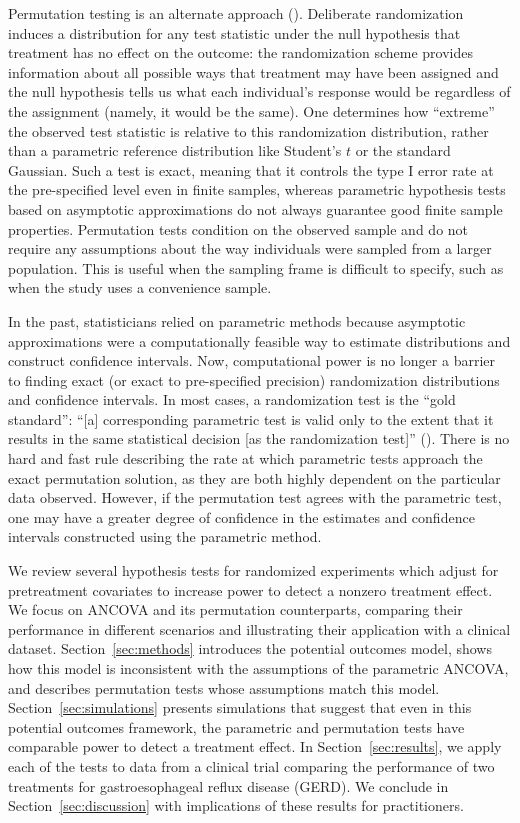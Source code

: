 \documentclass[12pt]{article}
\begin{document}
Permutation testing is an alternate approach (\cite{fisher_design_1935, pitman_significance_1937,pitman_significance_1938}).
Deliberate randomization induces a distribution for any test statistic under the null hypothesis that treatment has no effect on the outcome:
the randomization scheme provides information about all possible ways that treatment may have been assigned 
and the null hypothesis tells us what each individual's response would be regardless of the assignment (namely, it would be the same).
One determines how ``extreme'' the observed test statistic is relative to this randomization distribution, rather than a parametric reference distribution like Student's $t$ or the standard Gaussian.
Such a test is exact, meaning that it controls the type I error rate at the pre-specified level even in finite samples, whereas parametric hypothesis tests based on asymptotic approximations do not always guarantee good finite sample properties.
Permutation tests condition on the observed sample and do not require any assumptions about the way individuals were sampled from a larger population.
This is useful when the sampling frame is difficult to specify, such as when the study uses a convenience sample.

In the past, statisticians relied on parametric methods because asymptotic approximations were a computationally feasible way to estimate distributions and construct confidence intervals.
Now, computational power is no longer a barrier to finding exact (or exact to pre-specified precision) randomization distributions and confidence intervals.
In most cases, a randomization test is the ``gold standard'':
``[a] corresponding parametric test is valid only to the extent that it results in the same statistical decision [as the randomization test]'' (\cite{bradley_distribution_1968}).
There is no hard and fast rule describing the rate at which parametric tests approach the exact permutation solution, as they are both highly dependent on the particular data observed.
However, if the permutation test agrees with the parametric test, one may have a greater degree of confidence in the estimates and confidence intervals constructed using the parametric method.

We review several hypothesis tests for randomized experiments which adjust for pretreatment covariates to increase power to detect a nonzero treatment effect.  
We focus on ANCOVA and its permutation counterparts, comparing their performance in different scenarios and illustrating their application with a clinical dataset.
Section~\ref{sec:methods} introduces the potential outcomes model, shows how this model is inconsistent with the assumptions of the parametric ANCOVA, and describes permutation tests whose assumptions match this model.
Section~\ref{sec:simulations} presents simulations that suggest that even in this potential outcomes framework, the parametric and permutation tests have comparable power to detect a treatment effect.
In Section~\ref{sec:results}, we apply each of the tests to data from a clinical trial comparing the performance of two treatments for gastroesophageal reflux disease (GERD).
We conclude in Section~\ref{sec:discussion} with implications of these results for practitioners.
\end{document}
